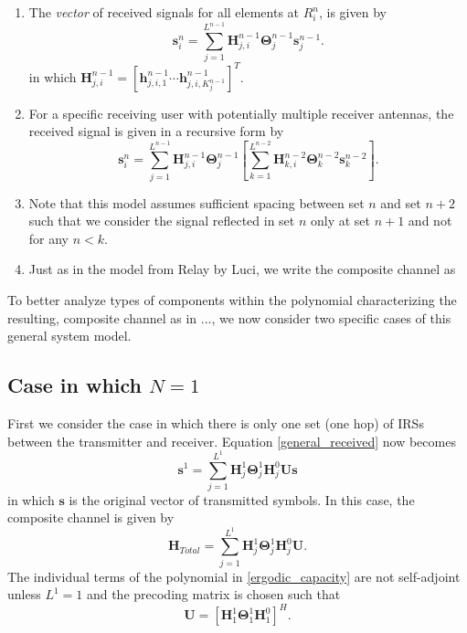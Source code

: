 \documentclass[12pt,a4paper]{report}
\begin{document}
\begin{enumerate}
\item
The \emph{vector} of received signals for all elements at $R^n_{i}$, is given by
\begin{equation}\label{received_vector}
\mathbf{s}^{n}_{i} = \sum_{j = 1}^{L^{n-1}} \mathbf{H}^{n-1}_{j,i}\boldsymbol{\Theta}^{n-1}_{j}\mathbf{s}^{n-1}_{j}.
\end{equation}
in which $\mathbf{H}^{n-1}_{j,i} = [\mathbf{h}^{n-1}_{j,i,1} \cdots \mathbf{h}^{n-1}_{j,i,K_{j}^{n-1}}]^T$.



\item For a specific receiving user with potentially multiple receiver antennas, the received signal is given in a recursive form by
\begin{equation}\label{general_received}
\mathbf{s}^{n}_{i} = \sum_{j = 1}^{L^{n-1}} \mathbf{H}^{n-1}_{j,i}\boldsymbol{\Theta}^{n-1}_{j} \left[
\sum_{k = 1}^{L^{n-2}} \mathbf{H}^{n-2}_{k,i}\boldsymbol{\Theta}^{n-2}_{k}\mathbf{s}^{n-2}_{k} \right].
\end{equation}

  
\item
	Note that this model assumes sufficient spacing between set $n$ and set $n+2$ such that we consider the signal reflected in set $n$ only at set $n+1$ and not for any $n<k$.


\item 
	Just as in the model from Relay by Luci, we write the composite channel as 

\end{enumerate}
To better analyze types of components within the polynomial characterizing the resulting, composite channel as in ..., we now consider two specific cases of this general system model.  

\subsection{Case in which $N=1$}
First we consider the case in which there is only one set (one hop) of IRSs between the transmitter and receiver. 
Equation \ref{general_received} now becomes 
\begin{equation}\label{N=1_received}
\mathbf{s}^{1} = \sum_{j = 1}^{L^{1}} \mathbf{H}^{1}_{j}\boldsymbol{\Theta}^{1}_{j}
\mathbf{H}^{0}_{j} \mathbf{U}\mathbf{s}
\end{equation}
in which $\mathbf{s}$ is the original vector of transmitted symbols. In this case, the composite channel is given by 
\begin{equation}
\mathbf{H}_{Total} = \sum_{j = 1}^{L^{1}} \mathbf{H}^{1}_{j}\boldsymbol{\Theta}^{1}_{j}
\mathbf{H}^{0}_{j}\mathbf{U}.
\end{equation}
The individual terms of the polynomial in \eqref{ergodic_capacity} are not self-adjoint unless $L^{1} = 1$ and the precoding matrix is chosen such that 
\begin{equation}
\mathbf{U} = [\mathbf{H}^{1}_{1}\boldsymbol{\Theta}^{1}_{1}\mathbf{H}^{0}_{1}]^H.
\end{equation}
\end{document}
